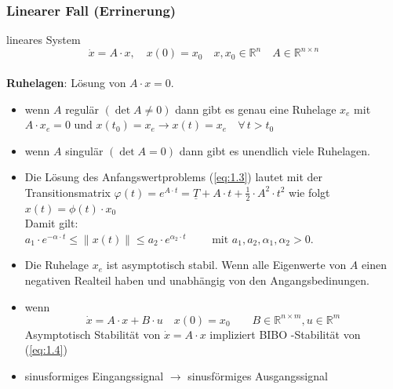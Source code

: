\documentclass[11pt,a4paper]{article}
\begin{document}
\subsubsection{Linearer Fall (Errinerung)}
lineares System 
\begin{equation*}\dot{x} = A\cdot x , \quad x(0) = x_{0} \quad x, x_{0} \in \mathbb{R}^{n}\quad A  \in \mathbb{R}^{n\times n}
\tag{1.3}
\label{eq:1.3}
\end{equation*} 
\\
\textbf{Ruhelagen}: Lösung von $A\cdot x = 0.$\\
\begin{itemize}
\item wenn $A$ regulär $(\det A\ne 0)$ dann gibt es genau eine Ruhelage $x_{e}$ mit $A\cdot x_{e}=0$ und $x(t_{0})=x_{e} \rightarrow x(t)=x_{e} \quad \forall \, t > t_{0}$
\item wenn $A$ singulär $(\det{A} = 0)$ dann gibt es unendlich viele Ruhelagen.
\item Die Lösung des Anfangswertproblems (\ref{eq:1.3}) lautet mit der\\ Transitionsmatrix $\varphi(t)=e^{A\cdot t} = \underline{T} + A\cdot t + \frac{1}{2} \cdot A^2 \cdot t^2 $ wie folgt 
$x(t) = \phi(t)\cdot x_{0}$ \\ Damit gilt:\\ $a_{1}\cdot e^{-\alpha \cdot t} \leq \parallel x(t) \parallel \leq a_{2}\cdot e^{\alpha_{2} \cdot t} \qquad \text{ mit }a_{1}, a_{2}, \alpha_{1}, \alpha_{2} > 0.$
\item Die Ruhelage $x_{e}$ ist asymptotisch stabil. Wenn alle Eigenwerte von $A$ einen negativen Realteil haben und unabhängig von den Angangsbedinungen.
\item wenn 
\begin{equation}
\dot{x} = A\cdot x + B\cdot u \quad x(0) = x_{0}
\qquad B \in \mathbb{R}^{n\times m}, u \in \mathbb{R}^{m}
\tag{1.4}
\label{eq:1.4}
\end{equation}
Asymptotisch Stabilität von $\dot{x}= A\cdot x $ impliziert BIBO -Stabilität von (\ref{eq:1.4})
\item sinusformiges Eingangssignal $\rightarrow$ sinusförmiges Ausgangssignal
\end{itemize}
\end{document}
